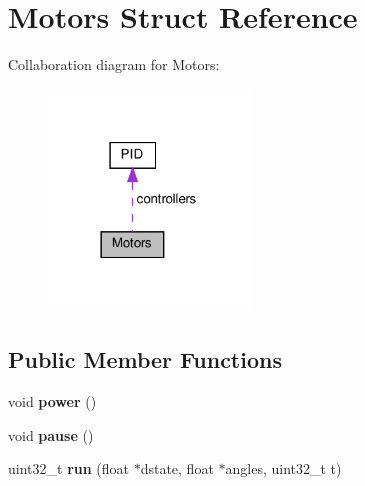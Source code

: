 \hypertarget{structMotors}{}\section{Motors Struct Reference}
\label{structMotors}


Collaboration diagram for Motors\+:
\nopagebreak
\begin{figure}[H]
\begin{center}
\leavevmode
\includegraphics[width=153pt]{structMotors__coll__graph}
\end{center}
\end{figure}
\subsection*{Public Member Functions}
\begin{DoxyCompactItemize}
\item 
\mbox{\label{structMotors_ac6532a754e5f1743ee4975b6722b4054}} 
void {\bfseries power} ()
\item 
\mbox{\label{structMotors_a179c6a24115935994a13493f74f56df8}} 
void {\bfseries pause} ()
\item 
\mbox{\label{structMotors_a0d3909ec9fadbb3028368e7340a2e707}} 
uint32\+\_\+t {\bfseries run} (float $\ast$dstate, float $\ast$angles, uint32\+\_\+t t)
\end{DoxyCompactItemize}
